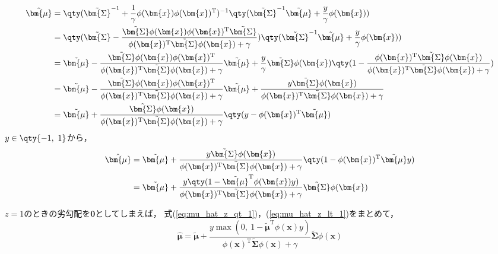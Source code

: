\documentclass[class=jsarticle, crop=false, dvipdfmx, fleqn]{standalone}
\begin{document}
\begin{align}
    \hat{\bm{\mu}}
        & = \qty(\tilde{\bm{\Sigma}}^{-1} + \frac{1}{\gamma} \phi(\bm{x}) \phi(\bm{x})^\mathrm{T})^{-1} \qty(\tilde{\bm{\Sigma}}^{-1} \tilde{\bm{\mu}} + \frac{y}{\gamma} \phi(\bm{x})) \\
        & = \qty(\tilde{\bm{\Sigma}} - \frac{\tilde{\bm{\Sigma}} \phi(\bm{x}) \phi(\bm{x})^\mathrm{T} \tilde{\bm{\Sigma}}}{\phi(\bm{x})^\mathrm{T} \tilde{\bm{\Sigma}} \phi(\bm{x}) + \gamma}) \qty(\tilde{\bm{\Sigma}}^{-1} \tilde{\bm{\mu}} + \frac{y}{\gamma} \phi(\bm{x})) \\
        & = \tilde{\bm{\mu}} - \frac{\tilde{\bm{\Sigma}} \phi(\bm{x}) \phi(\bm{x})^\mathrm{T}}{\phi(\bm{x})^\mathrm{T} \tilde{\bm{\Sigma}} \phi(\bm{x}) + \gamma} \tilde{\bm{\mu}} + \frac{y}{\gamma} \tilde{\bm{\Sigma}} \phi(\bm{x}) \qty(1 - \frac{\phi(\bm{x})^\mathrm{T} \tilde{\bm{\Sigma}}\phi(\bm{x})}{\phi(\bm{x})^\mathrm{T} \tilde{\bm{\Sigma}} \phi(\bm{x}) + \gamma}) \\
        & = \tilde{\bm{\mu}} - \frac{\tilde{\bm{\Sigma}} \phi(\bm{x}) \phi(\bm{x})^\mathrm{T}}{\phi(\bm{x})^\mathrm{T} \tilde{\bm{\Sigma}} \phi(\bm{x}) + \gamma} \tilde{\bm{\mu}} + \frac{y \tilde{\bm{\Sigma}} \phi(\bm{x})}{\phi(\bm{x})^\mathrm{T} \tilde{\bm{\Sigma}} \phi(\bm{x}) + \gamma} \\
        & = \tilde{\bm{\mu}} + \frac{\tilde{\bm{\Sigma}} \phi(\bm{x})}{\phi(\bm{x})^\mathrm{T} \tilde{\bm{\Sigma}} \phi(\bm{x}) + \gamma} \qty(y - \phi(\bm{x})^\mathrm{T} \tilde{\bm{\mu}})
\end{align}
\(y \in \qty{-1,\ 1}\)から，
\begin{align}
    \hat{\bm{\mu}}
        & = \tilde{\bm{\mu}} + \frac{y \tilde{\bm{\Sigma}} \phi(\bm{x})}{\phi(\bm{x})^\mathrm{T} \tilde{\bm{\Sigma}} \phi(\bm{x}) + \gamma} \qty(1 - \phi(\bm{x})^\mathrm{T} \tilde{\bm{\mu}} y) \\
        & = \tilde{\bm{\mu}} + \frac{y \qty(1 - \tilde{\bm{\mu}}^\mathrm{T} \phi(\bm{x}) y)}{\phi(\bm{x})^\mathrm{T} \tilde{\bm{\Sigma}} \phi(\bm{x}) + \gamma} \tilde{\bm{\Sigma}} \phi(\bm{x})
        \label{eq:mu_hat_z_lt_1}
\end{align}

\(z = 1\)のときの劣勾配を\(\bm{0}\)としてしまえば，
式(\ref{eq:mu_hat_z_qt_1})，(\ref{eq:mu_hat_z_lt_1})をまとめて，
\begin{equation}
    \hat{\bm{\mu}} = \tilde{\bm{\mu}} + \frac{y \max(0,\ 1 - \tilde{\bm{\mu}}^\mathrm{T} \phi(\bm{x}) y)}{\phi(\bm{x})^\mathrm{T} \tilde{\bm{\Sigma}} \phi(\bm{x}) + \gamma} \tilde{\bm{\Sigma}} \phi(\bm{x})
\end{equation}
\end{document}
